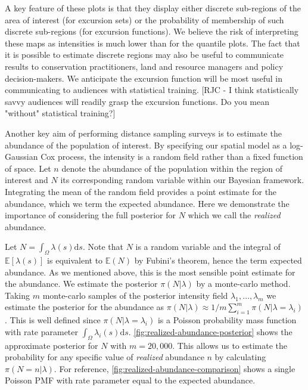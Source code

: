 \documentclass[preprint,12pt]{elsarticle}
\begin{document}
A key feature of these plots is that they display either discrete sub-regions of the area of interest (for excursion sets) or the probability of membership of such discrete sub-regions (for excursion functions).  We believe the risk of interpreting these maps as intensities is much lower than for the quantile plots.  The fact that it is possible to estimate discrete regions may also be useful to communicate results to conservation practitioners, land and resource managers and policy decision-makers.  We anticipate the excursion function will be most useful in communicating to audiences with statistical training. [RJC - I think statistically savvy audiences will readily grasp the excursion functions. Do you mean "without" statistical training?]

Another key aim of performing distance sampling surveys is to estimate the abundance of the population of interest.  By specifying our spatial model as a log-Gaussian Cox process, the intensity is a random field rather than a fixed function of space. Let $n$ denote the abundance of the population within the region of interest and $N$ its corresponding random variable within our Bayesian framework.  Integrating the mean of the random field provides a point estimate for the abundance, which we term the expected abundance.  Here we demonstrate the importance of considering the full posterior for $N$ which we call the \textit{realized} abundance.

Let $N = \int_{\Omega}\lambda(s)\mathrm{d}s$. Note that $N$ is a random variable and the integral of $\mathbb{E}[\lambda(s)]$ is equivalent to $\mathbb{E}(N)$ by Fubini's theorem, hence the term expected abundance.  As we mentioned above, this is the most sensible point estimate for the abundance.  We estimate the posterior $\pi(N | \lambda)$ by a monte-carlo method.  Taking $m$ monte-carlo samples of the posterior intensity field $\lambda_1, \ldots, \lambda_m$ we estimate the posterior for the abundance as $\pi(N | \lambda) \approx 1 / m \sum_{i=1}^m \pi (N | \lambda = \lambda_i)$. This is well defined since $\pi(N | \lambda = \lambda_i)$ is a Poisson probability mass function with rate parameter $\int_{\Omega}\lambda_i(s)\mathrm{d}s$. \autoref{fig:realized-abundance-posterior} shows the approximate posterior for $N$ with $m = 20,000$.  This allows us to estimate the probability for any specific value of \textit{realized} abundance $n$ by calculating $\pi(N = n | \lambda)$.  For reference, \autoref{fig:realized-abundance-comparison} shows a single Poisson PMF with rate parameter equal to the expected abundance.
\end{document}
